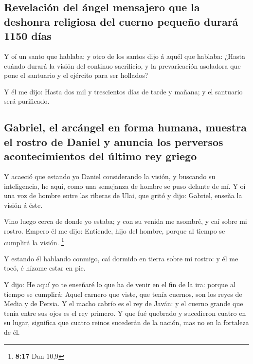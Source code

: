 \hypertarget{revelaciuxf3n-del-uxe1ngel-mensajero-que-la-deshonra-religiosa-del-cuerno-pequeuxf1o-duraruxe1-1150-duxedas}{%
\subsection{Revelación del ángel mensajero que la deshonra religiosa del
cuerno pequeño durará 1150
días}\label{revelaciuxf3n-del-uxe1ngel-mensajero-que-la-deshonra-religiosa-del-cuerno-pequeuxf1o-duraruxe1-1150-duxedas}}

 Y oí un santo que hablaba; y otro de los santos dijo á
aquél que hablaba: ¿Hasta cuándo durará la visión del continuo
sacrificio, y la prevaricación asoladora que pone el santuario y el
ejército para ser hollados?

 Y él me dijo: Hasta dos mil y trescientos días de tarde
y mañana; y el santuario será purificado.

\hypertarget{gabriel-el-arcuxe1ngel-en-forma-humana-muestra-el-rostro-de-daniel-y-anuncia-los-perversos-acontecimientos-del-uxfaltimo-rey-griego}{%
\subsection{Gabriel, el arcángel en forma humana, muestra el rostro de
Daniel y anuncia los perversos acontecimientos del último rey
griego}\label{gabriel-el-arcuxe1ngel-en-forma-humana-muestra-el-rostro-de-daniel-y-anuncia-los-perversos-acontecimientos-del-uxfaltimo-rey-griego}}

 Y acaeció que estando yo Daniel considerando la visión,
y buscando su inteligencia, he aquí, como una semejanza de hombre se
puso delante de mí.  Y oí una voz de hombre entre las
riberas de Ulai, que gritó y dijo: Gabriel, enseña la visión á éste.

 Vino luego cerca de donde yo estaba; y con su venida me
asombré, y caí sobre mi rostro. Empero él me dijo: Entiende, hijo del
hombre, porque al tiempo se cumplirá la visión. \footnote{\textbf{8:17}
  Dan 10,9}

 Y estando él hablando conmigo, caí dormido en tierra
sobre mi rostro: y él me tocó, é hízome estar en pie.

 Y dijo: He aquí yo te enseñaré lo que ha de venir en el
fin de la ira: porque al tiempo se cumplirá:  Aquel
carnero que viste, que tenía cuernos, son los reyes de Media y de
Persia.  Y el macho cabrío es el rey de Javán: y el
cuerno grande que tenía entre sus ojos es el rey primero.
 Y que fué quebrado y sucedieron cuatro en su lugar,
significa que cuatro reinos sucederán de la nación, mas no en la
fortaleza de él.

